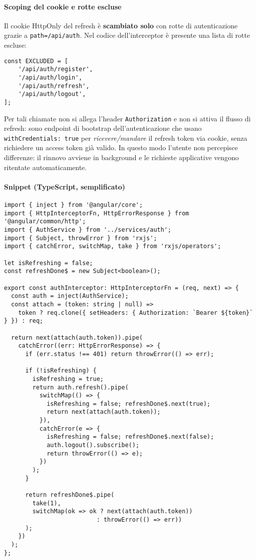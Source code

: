 \documentclass[12pt,a4paper]{article}
\begin{document}
\paragraph{Scoping del cookie e rotte escluse}
Il cookie HttpOnly del refresh è \textbf{scambiato solo} con rotte di autenticazione grazie a \texttt{path=/api/auth}. Nel codice dell'interceptor è presente una lista di rotte escluse:
\begin{verbatim}
const EXCLUDED = [
	'/api/auth/register',
	'/api/auth/login',
	'/api/auth/refresh',
	'/api/auth/logout',
];
\end{verbatim}
Per tali chiamate non si allega l'header \texttt{Authorization} e non si attiva il flusso di refresh: sono endpoint di bootstrap dell'autenticazione che usano \texttt{withCredentials: true} per \emph{ricevere/mandare} il refresh token via cookie, senza richiedere un access token già valido. In questo modo l'utente non percepisce differenze: il rinnovo avviene in background e le richieste applicative vengono ritentate automaticamente.

\paragraph{Snippet (TypeScript, semplificato)}
\begin{verbatim}
import { inject } from '@angular/core';
import { HttpInterceptorFn, HttpErrorResponse } from '@angular/common/http';
import { AuthService } from '../services/auth';
import { Subject, throwError } from 'rxjs';
import { catchError, switchMap, take } from 'rxjs/operators';

let isRefreshing = false;
const refreshDone$ = new Subject<boolean>();

export const authInterceptor: HttpInterceptorFn = (req, next) => {
  const auth = inject(AuthService);
  const attach = (token: string | null) =>
    token ? req.clone({ setHeaders: { Authorization: `Bearer ${token}` } }) : req;

  return next(attach(auth.token)).pipe(
    catchError((err: HttpErrorResponse) => {
      if (err.status !== 401) return throwError(() => err);

      if (!isRefreshing) {
        isRefreshing = true;
        return auth.refresh().pipe(
          switchMap(() => {
            isRefreshing = false; refreshDone$.next(true);
            return next(attach(auth.token));
          }),
          catchError(e => {
            isRefreshing = false; refreshDone$.next(false);
            auth.logout().subscribe();
            return throwError(() => e);
          })
        );
      }

      return refreshDone$.pipe(
        take(1),
        switchMap(ok => ok ? next(attach(auth.token))
                          : throwError(() => err))
      );
    })
  );
};
\end{verbatim}
\end{document}
